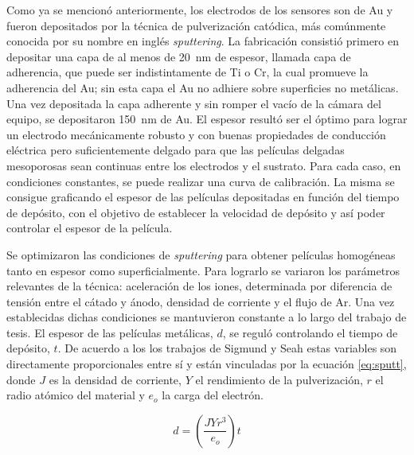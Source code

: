 		 Como ya se mencionó anteriormente, los electrodos de los sensores son de Au y fueron depositados por la técnica de pulverización catódica, más comúnmente conocida por su nombre en inglés \textit{sputtering}. La fabricación consistió primero en depositar una capa de al menos de \SI{20}{\nm} de espesor, llamada capa de  adherencia, que puede ser indistintamente de Ti o Cr, la cual promueve la adherencia del Au; sin esta capa el Au no adhiere sobre superficies no metálicas.\cite{Hieber1976} Una vez depositada la capa adherente y sin romper el vacío de la cámara del equipo, se depositaron \SI{150}{nm} de Au. El espesor resultó ser el óptimo para lograr un electrodo mecánicamente robusto y con buenas propiedades de conducción eléctrica pero suficientemente delgado para que las películas delgadas mesoporosas sean continuas entre los electrodos y el sustrato. Para cada caso, en condiciones constantes, se puede realizar una curva de calibración. La misma se consigue graficando el espesor de las películas depositadas en función del tiempo de depósito, con el objetivo de establecer la velocidad de depósito y así poder controlar el espesor de la película. 

		 Se optimizaron las condiciones de \textit{sputtering} para obtener películas homogéneas tanto en espesor como superficialmente. Para lograrlo se variaron los parámetros relevantes de la técnica: aceleración de los iones, determinada por diferencia de tensión entre el cátado y ánodo, densidad de corriente y el flujo de Ar. Una vez establecidas dichas condiciones se mantuvieron constante a lo largo del trabajo de tesis. El espesor de las películas metálicas, $d$, se reguló controlando el tiempo de depósito, $t$. De acuerdo a los los trabajos de Sigmund\cite{sigmund1968} y Seah\cite{Seah2005} estas variables son directamente proporcionales entre sí y están vinculadas por la ecuación \ref{eq:sputt}, donde $J$ es la densidad de corriente, $Y$ el rendimiento de la pulverización, $r$ el radio atómico del material y $e_o$ la carga del electrón.

	 			\begin{equation}
	 				d=\left(\frac{JYr^3}{e_o}\right)t
	 				\label{eq:sputt}
	 			\end{equation}

